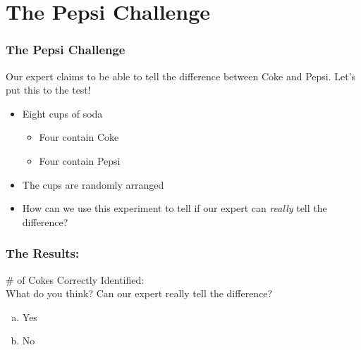 \documentclass{beamer}
\begin{document}
\section{The Pepsi Challenge}
\begin{frame}
\frametitle{The Pepsi Challenge}
Our expert claims to be able to tell the difference between Coke and Pepsi. Let's put this to the test! 
\begin{itemize}
\item Eight cups of soda 
	\begin{itemize}
\item Four contain Coke 
\item Four contain Pepsi 
\end{itemize}
	\item The cups are randomly arranged 
	\item How can we use this experiment to tell if our expert can \emph{\alert{really}} tell the difference?
\end{itemize}
\end{frame}
\begin{frame}
\frametitle{The Results:}
	\# of Cokes Correctly Identified: \\ \vspace{2em}
	\alert{What do you think? Can our expert really tell the difference? }
		\begin{enumerate}[(a)]
\item Yes
\item No
\end{enumerate}
\end{frame}
\end{document}
